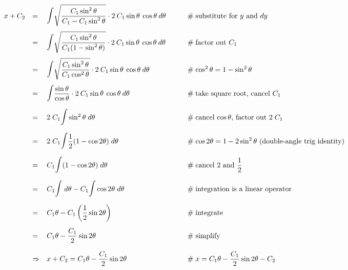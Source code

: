 \documentclass{article}
\theoremstyle{definition}
\begin{document}
\medskip
\begin{equation*}
\begin{array}{lllll}
x + C_2
&=& \mathlarger{\mathlarger{\mathlarger{\int}}}	
\sqrt{\dfrac{C_1 \sin^2 \theta}{C_1 - C_1 \sin^2 \theta}} \cdot	2 \: C_1 \sin \theta \: \cos \theta \: d\theta
			&\qquad \mathrel{\#} \text{substitute for $y$ and $dy$} \\
[15pt]
&=& \mathlarger {\mathlarger{\mathlarger{\int}}}	
\sqrt{\dfrac{C_1 \sin^2 \theta}{C_1 (1 - \sin^2 \theta)}} \cdot	2 \: C_1 \sin \theta \: \cos \theta \: d\theta												
			&\qquad \mathrel{\#} \text{factor out $C_1$} \\
[15pt]
&=& \mathlarger{\mathlarger{\mathlarger{\int}}}	\sqrt{\dfrac{C_1 \sin^2 \theta}{C_1 \cos^2 \theta}}
\cdot 2 \: C_1 \sin \theta \: \cos \theta \: d\theta												
			&\qquad \mathrel{\#} \cos^2 \theta = 1 - \sin^2 \theta \\
[15pt]
&=& \mathlarger{\mathlarger{\mathlarger{\int}}}	\dfrac{\sin \theta}{\cos \theta}
\cdot 2 \: C_1 \sin \theta \: \cos \theta \: d\theta												
			&\qquad \mathrel{\#} \text{take square root, cancel $C_1$}\\
[15pt]
&=& 2 \; C_1 \mathlarger{\mathlarger{\mathlarger{\int}}} \sin^2 \theta \; d\theta												
			&\qquad \mathrel{\#} \text{cancel $\cos \theta$, factor out $2 \; C_1$}\\
[15pt]
&=& 2 \; C_1 \mathlarger{\mathlarger{\mathlarger{\int}}} \dfrac{1}{2} (1 - \cos 2\theta) \; d\theta												
			&\qquad \mathrel{\#} \text{$\cos 2 \theta = 1 - 2 \sin^2 \theta$ (double-angle trig identity)} \\
[15pt]
&=& C_1 \mathlarger{\mathlarger{\mathlarger{\int}}} (1 - \cos 2\theta) \; d\theta												
			&\qquad \mathrel{\#} \text{cancel $2$ and $\dfrac{1}{2}$} \\
[15pt]
&=& C_1 \mathlarger{\mathlarger{\mathlarger{\int}}} \; d\theta - 
C_1 \mathlarger{\mathlarger{\mathlarger{\int}}} \cos 2\theta \; d\theta									
			&\qquad \mathrel{\#} \text{integration is a linear operator} \\
[15pt]
&=& C_1 \theta - C_1 \left ( \dfrac{1}{2} \sin 2\theta \right )									
			&\qquad \mathrel{\#} \text{integrate} \\
[15pt]
&=& C_1 \theta - \dfrac{C_1}{2} \sin 2\theta									
			&\qquad \mathrel{\#} \text{simplify} \\
[15pt]
&\Rightarrow& 									
x + C_2  = C_1 \theta - \dfrac{C_1}{2} \sin 2\theta			
			&\qquad \mathrel{\#} x = C_1 \theta - \dfrac{C_1}{2} \sin 2\theta - C_2
\end{array}
\end{equation*}
\end{document}
